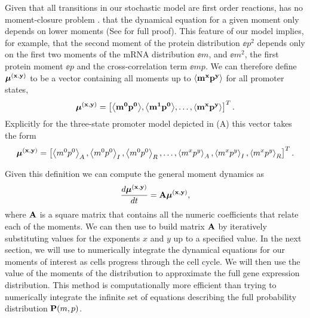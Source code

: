 Given that all transitions in our stochastic model are first order reactions,
 has no moment-closure problem \cite{Voliotis2014a}.  that the dynamical equation for a given moment only depends on
lower moments (See  for full proof). This feature of our
model implies, for example, that the second moment of the protein distribution
$\ee{p^2}$ depends only on the first two moments of the mRNA distribution
$\ee{m}$, and $\ee{m^2}$, the first protein moment $\ee{p}$  and the
cross-correlation term $\ee{mp}$. We can therefore define $\boldsymbol{\mu}^{\mathbf{(x, y)}}$ to be a vector
 containing all moments up to $\mathbf{\left\langle m^x p^y \right\rangle}$ for all promoter states,
\begin{equation}
\boldsymbol{\mu}^{\mathbf{(x, y)}} = \left[ \mathbf{\left\langle m^0 p^0 \right\rangle},
							\mathbf{\left\langle m^1 p^0 \right\rangle},
							\ldots, \mathbf{\left\langle m^x p^y \right\rangle} \right]^T.
\end{equation}
Explicitly for the three-state promoter model depicted in
(A) this vector takes the form
\begin{equation}
	\boldsymbol{\mu}^{\mathbf{(x, y)}} = \left[ \left\langle m^0 p^0 \right\rangle_A, \left\langle m^0 p^0 \right\rangle_I, \left\langle m^0 p^0 \right\rangle_R,
	\ldots, \left\langle m^x p^y \right\rangle_A, \left\langle m^x p^y \right\rangle_I, \left\langle m^x p^y \right\rangle_R \right]^T.
\end{equation}

Given this definition we can compute the general moment dynamics as
\begin{equation}
{d{\boldsymbol{\mu}^{\mathbf{(x, y)}}} \over dt} = \mathbf{A} \boldsymbol{\mu}^{\mathbf{(x, y)}},
\label{eq_mom_dynamics}
\end{equation}
where $\mathbf{A}$ is a square matrix that contains all the numeric coefficients
that relate each of the moments. We can then use  to build
matrix $\mathbf{A}$ by iteratively substituting values for the exponents $x$ and
$y$ up to a specified value. In the next section, we will use
 to numerically integrate the dynamical equations for our
moments of interest as cells progress through the cell cycle. We will then use
the value of the moments of the distribution to approximate the full gene
expression distribution. This method is computationally more efficient than
trying to numerically integrate the infinite set of equations describing the
full probability distribution $\mathbf{P}(m, p)$.
